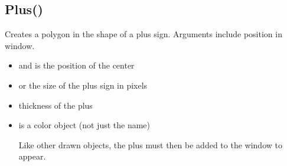 \documentclass[letterpaper,10pt,english]{sphinxmanual}
\begin{document}
\sphinxAtStartPar
{}

\sphinxAtStartPar
{}

\ignorespaces 

\subsection{Plus()}
\label{\detokenize{reference/graphics:plus}}\label{\detokenize{reference/graphics:index-13}}
\sphinxAtStartPar
{}

\sphinxAtStartPar
{}

\sphinxAtStartPar
Creates a polygon in the shape of a  plus sign. Arguments include position in window.
\begin{itemize}
\item {} 
\sphinxAtStartPar
{} and  is the position of the center

\item {} 
\sphinxAtStartPar
{} or the size of the plus sign in pixels

\item {} 
\sphinxAtStartPar
{} thickness of the plus

\item {} 
\sphinxAtStartPar
{} is a color object (not just the name)

\sphinxAtStartPar
Like other drawn objects, the plus must then be added to the window to appear.

\end{itemize}

\sphinxAtStartPar
{}

\begin{sphinxVerbatim}[commandchars=\\\{\}]
\end{sphinxVerbatim}

\sphinxAtStartPar
{}

\begin{sphinxVerbatim}[commandchars=\\\{\}]
\end{sphinxVerbatim}
\end{document}
